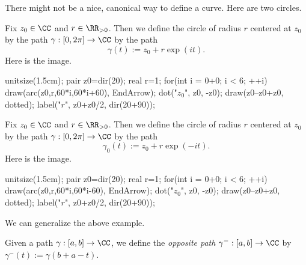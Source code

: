 There might not be a nice, canonical way to define a curve. Here are two circles.
\begin{example}
	Fix $z_0\in\CC$ and $r\in\RR_{>0}$. Then we define the circle of radius $r$ centered at $z_0$ by the path $\gamma:[0,2\pi]\to\CC$ by the path
	\[\gamma(t):=z_0+r\exp(it).\]
	Here is the image.
	\begin{center}
		\begin{asy}
			unitsize(1.5cm);
			pair z0=dir(20);
			real r=1;
			for(int i = 0+0; i < 6; ++i)
				draw(arc(z0,r,60*i,60*i+60), EndArrow);
			dot("$z_0$", z0, -z0);
			draw(z0--z0+z0, dotted);
			label("$r$", z0+z0/2, dir(20+90));
		\end{asy}
	\end{center}
\end{example}
\begin{example}
	Fix $z_0\in\CC$ and $r\in\RR_{>0}$. Then we define the circle of radius $r$ centered at $z_0$ by the path $\gamma:[0,2\pi]\to\CC$ by the path
	\[\gamma_0(t):=z_0+r\exp(-it).\]
	Here is the image.
	\begin{center}
		\begin{asy}
			unitsize(1.5cm);
			pair z0=dir(20);
			real r=1;
			for(int i = 0+0; i < 6; ++i)
				draw(arc(z0,r,60*i,60*i-60), EndArrow);
			dot("$z_0$", z0, -z0);
			draw(z0--z0+z0, dotted);
			label("$r$", z0+z0/2, dir(20+90));
		\end{asy}
	\end{center}
\end{example}
We can generalize the above example.
\begin{definition}
	Given a path $\gamma:[a,b]\to\CC$, we define the \textit{opposite path} $\gamma^-:[a,b]\to\CC$ by $\gamma^-(t):=\gamma(b+a-t)$.
\end{definition}

